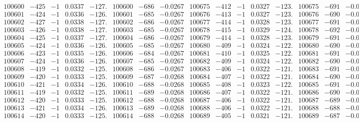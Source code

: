 \documentclass[11pt,reqno,a4letter]{article}
\numberwithin{figure}{section}
\numberwithin{table}{section}
\theoremstyle{plain}
\numberwithin{theorem}{section}
\theoremstyle{definition}
\begin{document}
\begin{table}[ht!]
\begin{equation*}
{\begin{array}{ccccc|ccc||ccccc|ccc}
100600 & -425 & -1 & 0.0337 & -127. & 100600 & -686 & -0.0267 & 100675 & -412 & -1 & 0.0327 & -123. & 100675 & -691 & -0.0269  \\
100601 & -424 & -1 & 0.0336 & -126. & 100601 & -685 & -0.0267 & 100676 & -413 & -1 & 0.0327 & -123. & 100676 & -690 & -0.0268  \\
100602 & -427 & -1 & 0.0338 & -127. & 100602 & -686 & -0.0267 & 100677 & -414 & -1 & 0.0328 & -123. & 100677 & -691 & -0.0269  \\
100603 & -426 & -1 & 0.0338 & -127. & 100603 & -685 & -0.0267 & 100678 & -415 & -1 & 0.0329 & -124. & 100678 & -692 & -0.0269  \\
100604 & -425 & -1 & 0.0337 & -127. & 100604 & -686 & -0.0267 & 100679 & -414 & -1 & 0.0328 & -123. & 100679 & -691 & -0.0269  \\
100605 & -424 & -1 & 0.0336 & -126. & 100605 & -685 & -0.0267 & 100680 & -409 & -1 & 0.0324 & -122. & 100680 & -690 & -0.0268  \\
100606 & -423 & -1 & 0.0335 & -126. & 100606 & -684 & -0.0267 & 100681 & -410 & -1 & 0.0325 & -122. & 100681 & -691 & -0.0269  \\
100607 & -424 & -1 & 0.0336 & -126. & 100607 & -685 & -0.0267 & 100682 & -409 & -1 & 0.0324 & -122. & 100682 & -690 & -0.0268  \\
100608 & -419 & -1 & 0.0332 & -125. & 100608 & -686 & -0.0267 & 100683 & -406 & -1 & 0.0322 & -121. & 100683 & -691 & -0.0269  \\
100609 & -420 & -1 & 0.0333 & -125. & 100609 & -687 & -0.0268 & 100684 & -407 & -1 & 0.0322 & -121. & 100684 & -690 & -0.0268  \\
100610 & -421 & -1 & 0.0334 & -126. & 100610 & -688 & -0.0268 & 100685 & -408 & -1 & 0.0323 & -122. & 100685 & -691 & -0.0269  \\
100611 & -419 & -1 & 0.0332 & -125. & 100611 & -689 & -0.0268 & 100686 & -407 & -1 & 0.0322 & -121. & 100686 & -690 & -0.0268  \\
100612 & -420 & -1 & 0.0333 & -125. & 100612 & -688 & -0.0268 & 100687 & -406 & -1 & 0.0322 & -121. & 100687 & -689 & -0.0268  \\
100613 & -421 & -1 & 0.0334 & -126. & 100613 & -689 & -0.0268 & 100688 & -406 & -1 & 0.0322 & -121. & 100688 & -688 & -0.0268  \\
100614 & -420 & -1 & 0.0333 & -125. & 100614 & -688 & -0.0268 & 100689 & -405 & -1 & 0.0321 & -121. & 100689 & -687 & -0.0267  \\
\end{array}
}
\end{equation*} 

\end{table}
\clearpage 
\end{document}
